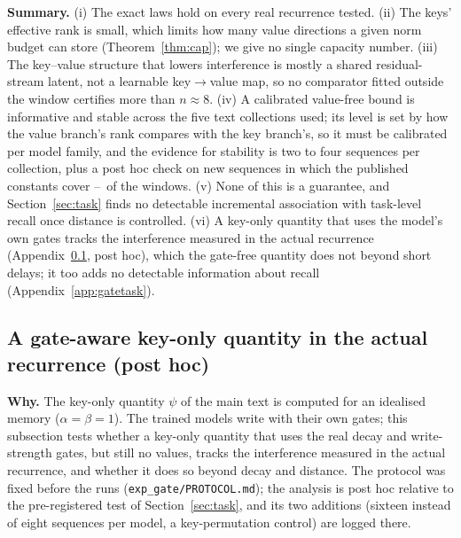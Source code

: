 \begin{table}[!htbp]
  \caption{Coverage of the published $r_{90}$ on held-out sequences (post hoc; 95\% cluster-bootstrap intervals over the new sequences). $n$: window size; held-out $r_{90}$: the 90th percentile of RMS/$\psi_{\rm rms}$ on the new sequences.}\label{tab:heldout}
  \centering\scriptsize\setlength{\tabcolsep}{4pt}
  
\end{table}

\textbf{Summary.} (i) The exact laws hold on every real recurrence tested. (ii) The keys' effective rank is small, which limits how many value directions a given norm budget can store (Theorem~\ref{thm:cap}); we give no single capacity number. (iii) The key--value structure that lowers interference is mostly a shared residual-stream latent, not a learnable key$\to$value map, so no comparator fitted outside the window certifies more than $n\approx8$. (iv) A calibrated value-free bound is informative and stable across the five text collections used; its level is set by how the value branch's rank compares with the key branch's, so it must be calibrated per model family, and the evidence for stability is two to four sequences per collection, plus a post hoc check on new sequences in which the published constants cover \heldCovLo--\heldCovHi\ of the windows. (v) None of this is a guarantee, and Section~\ref{sec:task} finds no detectable incremental association with task-level recall once distance is controlled. (vi) A key-only quantity that uses the model's own gates tracks the interference measured in the actual recurrence (Appendix~\ref{app:gate}, post hoc), which the gate-free quantity does not beyond short delays; it too adds no detectable information about recall (Appendix~\ref{app:gatetask}).

\subsection{A gate-aware key-only quantity in the actual recurrence (post hoc)}\label{app:gate}
\textbf{Why.} The key-only quantity $\psi$ of the main text is computed for an idealised memory ($\alpha=\beta=1$). The trained models write with their own gates; this subsection tests whether a key-only quantity that uses the real decay and write-strength gates, but still no values, tracks the interference measured in the actual recurrence, and whether it does so beyond decay and distance. The protocol was fixed before the runs (\texttt{exp\_gate/PROTOCOL.md}); the analysis is post hoc relative to the pre-registered test of Section~\ref{sec:task}, and its two additions (sixteen instead of eight sequences per model, a key-permutation control) are logged there.

